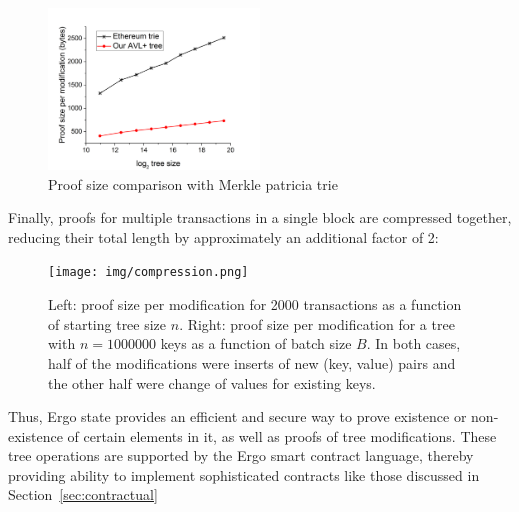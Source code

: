 
\begin{figure}[H]
    \centering
    \includegraphics[width=0.5\textwidth]{img/proofSize.png}
    \caption{Proof size comparison with Merkle patricia trie
    \label{fig:proofSize} }
\end{figure}

Finally, proofs for multiple transactions in a single block are compressed together, reducing their total length
by approximately an additional factor of 2:

\begin{figure}[H]
    \centering
    \texttt{[image: img/compression.png]}
    \caption{Left: proof size per modification for 2000 transactions as a function of starting tree size $n$.
    Right: proof size per modification for a tree with $n = 1 000 000$ keys as a function of batch size $B$.
    In both cases, half of the modifications were inserts of new (key, value) pairs and the other half were change of values for existing keys.
    \label{fig:compression} }
\end{figure}

Thus, Ergo state provides an efficient and secure way to prove existence or non-existence of certain elements in
it, as well as proofs of tree modifications.
These tree operations are supported by the Ergo smart contract language, thereby providing ability to implement sophisticated contracts like those discussed in Section~\ref{sec:contractual}





